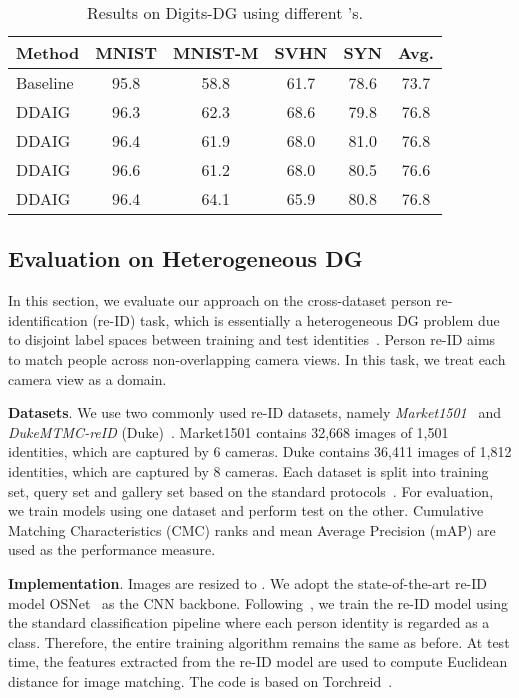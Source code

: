 \documentclass[letterpaper]{article}
\newcommand{\keypoint}[1]{\vspace{0.1cm}\noindent\textbf{#1}}
\newcommand{\tableCellHeight}{1.1}
\begin{document}
\begin{table}[t]
\setlength{\tabcolsep}{3.5pt}
\renewcommand{\arraystretch}{\tableCellHeight}
\centering
\footnotesize
\caption{Results on Digits-DG using different 's.}
\label{tab:impactOfLmda}
\begin{tabular}{l | c c c c | c}
\hline
Method & MNIST & MNIST-M & SVHN & SYN & Avg. \\
\hline
Baseline & 95.8 & 58.8 & 61.7 & 78.6 & 73.7 \\
DDAIG  & 96.3 & 62.3 & 68.6 & 79.8 & 76.8 \\
DDAIG  & 96.4 & 61.9 & 68.0 & 81.0 & 76.8 \\
DDAIG  & 96.6 & 61.2 & 68.0 & 80.5 & 76.6 \\
DDAIG  & 96.4 & 64.1 & 65.9 & 80.8 & 76.8 \\
\hline
\end{tabular}
\vspace{-0.3cm}
\end{table}

\subsection{Evaluation on Heterogeneous DG}
In this section, we evaluate our approach on the cross-dataset person re-identification (re-ID) task, which is essentially a heterogeneous DG problem due to disjoint label spaces between training and test identities~\cite{feature_critic}. Person re-ID aims to match people across non-overlapping camera views. In this task, we treat each camera view as a domain.

\keypoint{Datasets}.
We use two commonly used re-ID datasets, namely \emph{Market1501}~\cite{zheng2015scalable} and \emph{DukeMTMC-reID} (Duke)~\cite{ristani2016perform,zheng2017unlabeled}. Market1501 contains 32,668 images of 1,501 identities, which are captured by 6 cameras. Duke contains 36,411 images of 1,812 identities, which are captured by 8 cameras. Each dataset is split into training set, query set and gallery set based on the standard protocols~\cite{zheng2015scalable,zheng2017unlabeled}. For evaluation, we train models using one dataset and perform test on the other. Cumulative Matching Characteristics (CMC) ranks and mean Average Precision (mAP) are used as the performance measure.

\keypoint{Implementation}.
Images are resized to . We adopt the state-of-the-art re-ID model OSNet~\cite{zhou2019osnet,zhou2019learning} as the CNN backbone. Following~\cite{zhou2019osnet,zhou2019learning}, we train the re-ID model using the standard classification pipeline where each person identity is regarded as a class. Therefore, the entire training algorithm remains the same as before. At test time, the features extracted from the re-ID model are used to compute Euclidean distance for image matching. The code is based on Torchreid~\cite{torchreid}.
\end{document}

